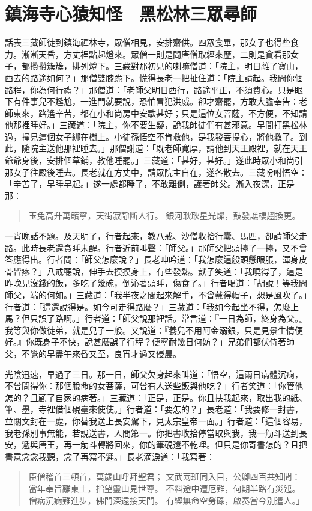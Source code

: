 
\chapter{鎮海寺心猿知怪　黑松林三眾尋師}

話表三藏師徒到鎮海禪林寺，眾僧相見，安排齋供。四眾食畢，那女子也得些食力。漸漸天昏，方丈裡點起燈來。眾僧一則是問唐僧取經來歷，二則是貪看那女子，都攢攢簇簇，排列燈下。三藏對那初見的喇嘛僧道：「院主，明日離了寶山，西去的路途如何？」那僧雙膝跪下。慌得長老一把扯住道：「院主請起。我問你個路程，你為何行禮？」那僧道：「老師父明日西行，路途平正，不須費心。只是眼下有件事兒不尷尬，一進門就要說，恐怕冒犯洪威。卻才齋罷，方敢大膽奉告：老師東來，路遙辛苦，都在小和尚房中安歇甚好；只是這位女菩薩，不方便，不知請他那裡睡好。」三藏道：「院主，你不要生疑，說我師徒們有甚邪意。早間打黑松林過，撞見這個女子綁在樹上。小徒孫悟空不肯救他，是我發菩提心，將他救了。到此，隨院主送他那裡睡去。」那僧謝道：「既老師寬厚，請他到天王殿裡，就在天王爺爺身後，安排個草鋪，教他睡罷。」三藏道：「甚好，甚好。」遂此時眾小和尚引那女子往殿後睡去。長老就在方丈中，請眾院主自在，遂各散去。三藏吩咐悟空：「辛苦了，早睡早起。」遂一處都睡了，不敢離側，護著師父。漸入夜深，正是那：
\begin{quote}
玉兔高升萬籟寧，天街寂靜斷人行。
銀河耿耿星光燦，鼓發譙樓趲換更。
\end{quote}

一宵晚話不題。及天明了，行者起來，教八戒、沙僧收拾行囊、馬匹，卻請師父走路。此時長老還貪睡未醒。行者近前叫聲：「師父。」那師父把頭擡了一擡，又不曾答應得出。行者問：「師父怎麼說？」長老呻吟道：「我怎麼這般頭懸眼脹，渾身皮骨皆疼？」八戒聽說，伸手去摸摸身上，有些發熱。獃子笑道：「我曉得了，這是昨晚見沒錢的飯，多吃了幾碗，倒沁著頭睡，傷食了。」行者喝道：「胡說！等我問師父，端的何如。」三藏道：「我半夜之間起來解手，不曾戴得帽子，想是風吹了。」行者道：「這還說得是。如今可走得路麼？」三藏道：「我如今起坐不得，怎麼上馬？但只誤了路啊。」行者道：「師父說那裡話。常言道：『一日為師，終身為父。』我等與你做徒弟，就是兒子一般。又說道：『養兒不用阿金溺銀，只是見景生情便好。』你既身子不快，說甚麼誤了行程？便寧耐幾日何妨？」兄弟們都伏侍著師父，不覺的早盡午來昏又至，良宵才過又侵晨。

光陰迅速，早過了三日。那一日，師父欠身起來叫道：「悟空，這兩日病體沉痾，不曾問得你：那個脫命的女菩薩，可曾有人送些飯與他吃？」行者笑道：「你管他怎的？且顧了自家的病著。」三藏道：「正是，正是。你且扶我起來，取出我的紙、筆、墨，寺裡借個硯臺來使使。」行者道：「要怎的？」長老道：「我要修一封書，並關文封在一處，你替我送上長安駕下，見太宗皇帝一面。」行者道：「這個容易，我老孫別事無能，若說送書，人間第一。你把書收拾停當取與我，我一觔斗送到長安，遞與唐王，再一觔斗轉將回來，你的筆硯還不乾哩。但只是你寄書怎的？且把書意念念我聽，念了再寫不遲。」長老滴淚道：「我寫著：
\begin{quote}
臣僧稽首三頓首，萬歲山呼拜聖君；
文武兩班同入目，公卿四百共知聞：
當年奉旨離東土，指望靈山見世尊。
不料途中遭厄難，何期半路有災迍。
僧病沉痾難進步，佛門深遠接天門。
有經無命空勞碌，啟奏當今別遣人。」
\end{quote}

